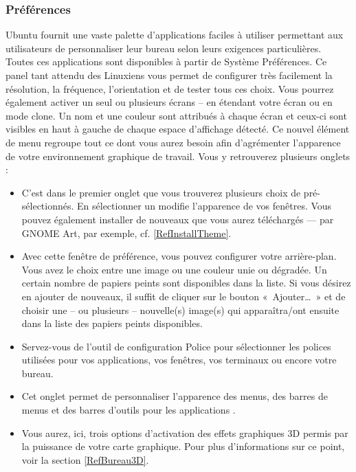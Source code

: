 \subsubsection{Préférences}
Ubuntu fournit une vaste palette d'applications faciles à utiliser permettant aux utilisateurs de personnaliser leur bureau selon leurs exigences particulières. Toutes ces applications sont disponibles à partir de Système \FlecheDroite Préférences. 
Ce panel tant attendu des Linuxiens vous permet de configurer très facilement la résolution, la fréquence, l'orientation et de tester tous ces choix. Vous pourrez également activer un seul ou plusieurs écrans -- en étendant votre écran ou en mode clone. Un nom et une couleur sont attribués à chaque écran et ceux-ci sont visibles en haut à gauche de chaque espace d'affichage détecté.
Ce nouvel élément de menu regroupe tout ce dont vous aurez besoin afin d'agrémenter l'apparence de votre environnement graphique de travail. Vous y retrouverez plusieurs onglets :
\begin{itemize}
\item C'est dans le premier onglet que vous trouverez plusieurs choix de  pré-sélectionnés. En sélectionner un modifie l'apparence de vos fenêtres. Vous pouvez également installer de nouveaux  que vous aurez téléchargés --- par GNOME Art, par exemple, cf. \ref{RefInstallTheme}.
\item Avec cette fenêtre de préférence, vous pouvez configurer votre arrière-plan. Vous avez le choix entre une image ou une couleur unie ou dégradée. Un certain nombre de papiers peints sont disponibles dans la liste. Si vous désirez en ajouter de nouveaux, il suffit de cliquer sur le bouton «~Ajouter\ldots{}~» et de choisir une -- ou plusieurs -- nouvelle(s) image(s) qui apparaîtra/ont ensuite dans la liste des papiers peints disponibles.
\item Servez-vous de l'outil de configuration Police pour sélectionner les polices utilisées pour vos applications, vos fenêtres, vos terminaux ou encore votre bureau. 
\item Cet onglet permet de personnaliser l'apparence des menus, des barres de menus et des barres d'outils pour les applications . 
\item Vous aurez, ici, trois options d'activation des effets graphiques 3D permis par la puissance de votre carte graphique. Pour plus d'informations sur ce point, voir la section \ref{RefBureau3D}.
\end{itemize}
